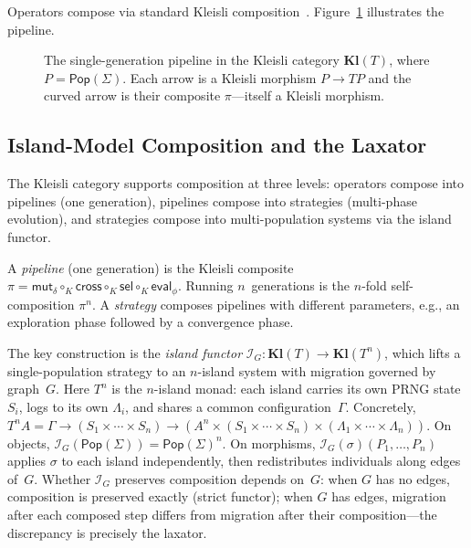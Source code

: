 \documentclass[submission,copyright,creativecommons]{eptcs}
\begin{document}
Operators compose via standard Kleisli composition~\cite{moggi1991notions}.
Figure~\ref{fig:kleisli-pipeline} illustrates the pipeline.

\begin{figure}[t]
\centering
{}
\caption{The single-generation pipeline in the Kleisli category
  $\mathbf{Kl}(T)$, where $P = \mathsf{Pop}(\Sigma)$.  Each arrow is a
  Kleisli morphism $P \to T\!P$ and the curved arrow is their composite
  $\pi$---itself a Kleisli morphism.}
\label{fig:kleisli-pipeline}
\end{figure}

\subsection{Island-Model Composition and the Laxator}
\label{sec:three-level}

The Kleisli category supports composition at three levels: operators
compose into pipelines (one generation), pipelines compose into
strategies (multi-phase evolution), and strategies compose into
multi-population systems via the island functor.

A \emph{pipeline} (one generation) is the Kleisli composite
$\pi = \mathsf{mut}_\delta \circ_K \mathsf{cross}
  \circ_K \mathsf{sel} \circ_K \mathsf{eval}_\phi$.
Running $n$~generations is the $n$-fold self-composition $\pi^n$.
A \emph{strategy} composes pipelines with different parameters,
e.g., an exploration phase followed by a convergence phase.

The key construction is the \emph{island functor}
$\mathcal{I}_G : \mathbf{Kl}(T) \to \mathbf{Kl}(T^n)$, which lifts
a single-population strategy to an $n$-island system with migration
governed by graph~$G$. Here $T^n$ is the $n$-island monad: each
island carries its own PRNG state $S_i$, logs to its own
$\Lambda_i$, and shares a common configuration~$\Gamma$. Concretely,
$T^n\!A = \Gamma \to (S_1 \times \cdots \times S_n) \to
(A^n \times (S_1 \times \cdots \times S_n) \times
(\Lambda_1 \times \cdots \times \Lambda_n))$.
On objects,
$\mathcal{I}_G(\mathsf{Pop}(\Sigma)) = \mathsf{Pop}(\Sigma)^n$. On
morphisms, $\mathcal{I}_G(\sigma)(P_1, \ldots, P_n)$ applies
$\sigma$ to each island independently, then redistributes
individuals along edges of~$G$. Whether $\mathcal{I}_G$ preserves
composition depends on~$G$: when $G$ has no edges, composition is
preserved exactly (strict functor); when $G$ has edges, migration
after each composed step differs from migration after their
composition---the discrepancy is precisely the laxator.
\end{document}
